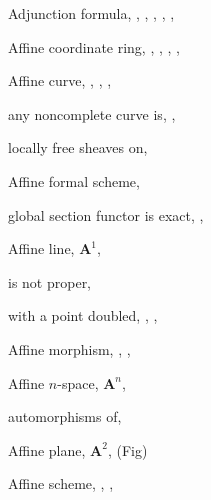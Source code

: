 {{\noindent\hspace*{0.0bp}Adjunction formula, , , , , ,\par
\noindent\hspace*{15.0bp}\par
\noindent\hspace*{0.0bp}Affine coordinate ring, , , , , \par
\noindent\hspace*{0.0bp}Affine curve, , , , \par
\noindent\hspace*{7.5bp}any noncomplete curve is, , \par
\noindent\hspace*{7.5bp}locally free sheaves on, \par
\noindent\hspace*{0.0bp}Affine formal scheme, \par
\noindent\hspace*{7.5bp}global section functor is exact, , \par
\noindent\hspace*{0.0bp}Affine line, $\mathbf A^1$, \par
\noindent\hspace*{7.5bp}is not proper, \par
\noindent\hspace*{7.5bp}with a point doubled, , , \par
\noindent\hspace*{0.0bp}Affine morphism, , , \par
\noindent\hspace*{0.0bp}Affine $n$-space, $\mathbf A^n$, \par
\noindent\hspace*{7.5bp}automorphisms of, \par
\noindent\hspace*{0.0bp}Affine plane, $\mathbf A^2$,  (Fig)\par
\noindent\hspace*{0.0bp}Affine scheme, , , \par
}}
